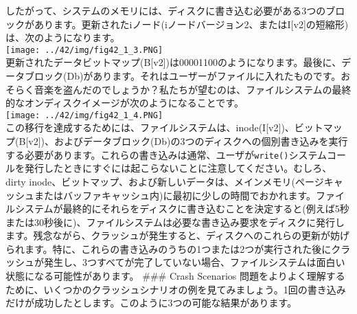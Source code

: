 したがって、システムのメモリには、ディスクに書き込む必要がある3つのブロックがあります。更新されたiノード(iノードバージョン2、またはI{[}v2{]}の短縮形)は、次のようになります。\\
\texttt{[image: ../42/img/fig42\_1\_3.PNG]}\\
更新されたデータビットマップ(B{[}v2{]})は00001100のようになります。最後に、データブロック(Db)があります。それはユーザーがファイルに入れたものです。おそらく音楽を盗んだのでしょうか？私たちが望むのは、ファイルシステムの最終的なオンディスクイメージが次のようになることです。\\
\texttt{[image: ../42/img/fig42\_1\_4.PNG]}\\
この移行を達成するためには、ファイルシステムは、inode(I{[}v2{]})、ビットマップ(B{[}v2{]})、およびデータブロック(Db)の3つのディスクへの個別書き込みを実行する必要があります。これらの書き込みは通常、ユーザが\texttt{write()}システムコールを発行したときにすぐには起こらないことに注意してください。むしろ、dirty
inode、ビットマップ、および新しいデータは、メインメモリ(ページキャッシュまたはバッファキャッシュ内)に最初に少しの時間でおかれます。ファイルシステムが最終的にそれらをディスクに書き込むことを決定すると(例えば5秒または30秒後に)、ファイルシステムは必要な書き込み要求をディスクに発行します。残念ながら、クラッシュが発生すると、ディスクへのこれらの更新が妨げられます。特に、これらの書き込みのうちの1つまたは2つが実行された後にクラッシュが発生し、3つすべてが完了していない場合、ファイルシステムは面白い状態になる可能性があります。
\#\#\# Crash Scenarios
問題をよりよく理解するために、いくつかのクラッシュシナリオの例を見てみましょう。1回の書き込みだけが成功したとします。このように3つの可能な結果があります。

